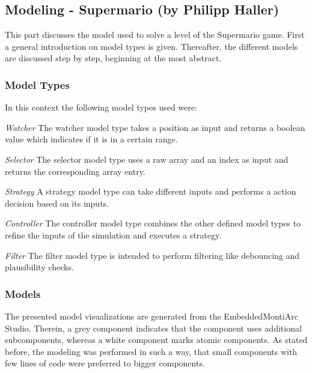 \newpage
\subsection{Modeling - Supermario (by Philipp Haller)}
This part discusses the model used to solve a level of the Supermario game. First a general introduction on model types is given. Thereafter, the different models are discussed step by step, beginning at the most abstract.

\subsubsection{Model Types}
In this context the following model types used were:
\newline

\emph{Watcher} \newline
The watcher model type takes a position as input and returns a boolean value which indicates if it is in a certain range.
\newline

\emph{Selector} \newline
The selector model type uses a raw array and an index as input and returns the corresponding array entry.
\newline

\emph{Strategy} \newline
A strategy model type can take different inputs and performs a action decision based on its inputs.
\newline

\emph{Controller} \newline
The controller model type combines the other defined model types to refine the inputs of the simulation and executes a strategy.
\newline

\emph{Filter} \newline
The filter model type is intended to perform filtering like debouncing and plausibility checks.

\subsubsection{Models}
The presented model visualizations are generated from the EmbeddedMontiArc Studio. Therein, a grey component indicates that the component uses additional subcomponents, whereas a white component marks atomic components. As stated before, the modeling was performed in such a way, that small components with few lines of code were preferred to bigger components.

